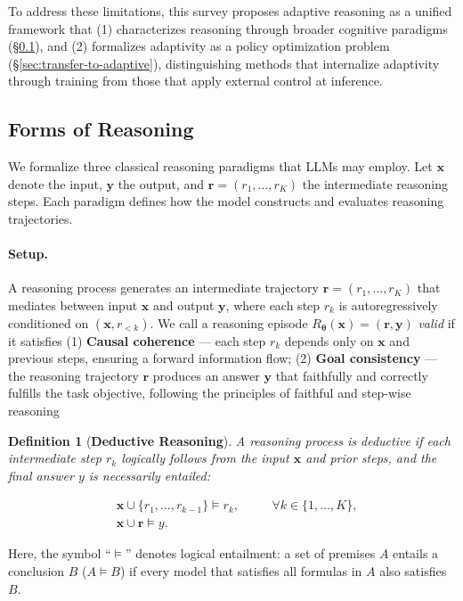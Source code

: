 \documentclass[11pt]{article}
\newtheorem{definition}{Definition}[section]
\begin{document}
To address these limitations, this survey proposes adaptive reasoning as a unified framework that (1) characterizes reasoning through broader cognitive paradigms (§\ref{sec:formal-reasoning}), and (2) formalizes adaptivity as a policy optimization problem (§\ref{sec:transfer-to-adaptive}), distinguishing methods that internalize adaptivity through training from those that apply external control at inference.

\subsection{Forms of Reasoning}
\label{sec:formal-reasoning}
We formalize three classical reasoning paradigms that LLMs may employ. Let $\mathbf{x}$ denote the input, $\mathbf{y}$ the output, and $\mathbf{r} = (r_1, \ldots, r_K)$ the intermediate reasoning steps. Each paradigm defines how the model constructs and evaluates reasoning trajectories.

\paragraph{Setup.}
A reasoning process generates an intermediate trajectory 
$\mathbf{r} = (r_1, \ldots, r_K)$ that mediates between input $\mathbf{x}$ 
and output $\mathbf{y}$, where each step $r_k$ is autoregressively conditioned on $(\mathbf{x}, r_{<k})$.
We call a reasoning episode $R_{\boldsymbol{\theta}}(\mathbf{x})=(\mathbf{r},\mathbf{y})$ \emph{valid}
if it satisfies (1) \textbf{Causal coherence} — each step $r_k$ depends only on $\mathbf{x}$ and previous steps, ensuring a forward information flow;
(2) \textbf{Goal consistency} — the reasoning trajectory $\mathbf{r}$ produces an answer $\mathbf{y}$ that faithfully and correctly fulfills the task objective, following the principles of faithful and step-wise reasoning \citep{lee2025evaluating,lyu2023faithful}



\begin{definition}[\textbf{Deductive Reasoning}]
A reasoning process is \emph{deductive} if each intermediate step $r_k$ 
logically follows from the input $\mathbf{x}$ and prior steps, and the 
final answer $y$ is necessarily entailed:

\begin{equation}
\begin{aligned}
&\mathbf{x} \cup \{r_1,\dots,r_{k-1}\} \models r_k, 
\quad &&\forall k \in \{1,\dots,K\},\\[3pt]
&\mathbf{x} \cup \mathbf{r} \models y. &&
\end{aligned}
\label{eq:deductive}
\end{equation}
\end{definition}
Here, the symbol ``$\models$'' denotes logical entailment: 
a set of premises $A$ entails a conclusion $B$ 
($A \models B$) if every model that satisfies all formulas in $A$ 
also satisfies $B$. 
\end{document}
